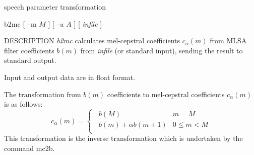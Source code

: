 % 
% 
% 
% 
%                                                                        
%
\hypertarget{b2mc}{}
%
{speech parameter transformation}

\begin{synopsis}
\item [b2mc] [ --m $M$ ] [ --a $A$ ] [ {\em infile} ]
\end{synopsis}

\begin{qsection}{DESCRIPTION}
{\em b2mc} calculates mel-cepstral coefficients $c_\alpha(m)$ 
from MLSA filter coefficients $b(m)$ from {\em infile} (or standard input), 
sending the result to standard output.

Input and output data are in float format.

The transformation from $b(m)$ coefficients to mel-cepstral coefficients
$c_\alpha(m)$ is as follows:
\begin{displaymath}
c_\alpha(m) = \begin{cases}
	  \;\; b(M) & m=M \\
	  \;\; b(m) + \alpha b(m+1) & 0 \leq m < M \\
	\end{cases}
\end{displaymath}
This transformation is the inverse transformation which is undertaken
by the command mc2b.

\end{qsection}

